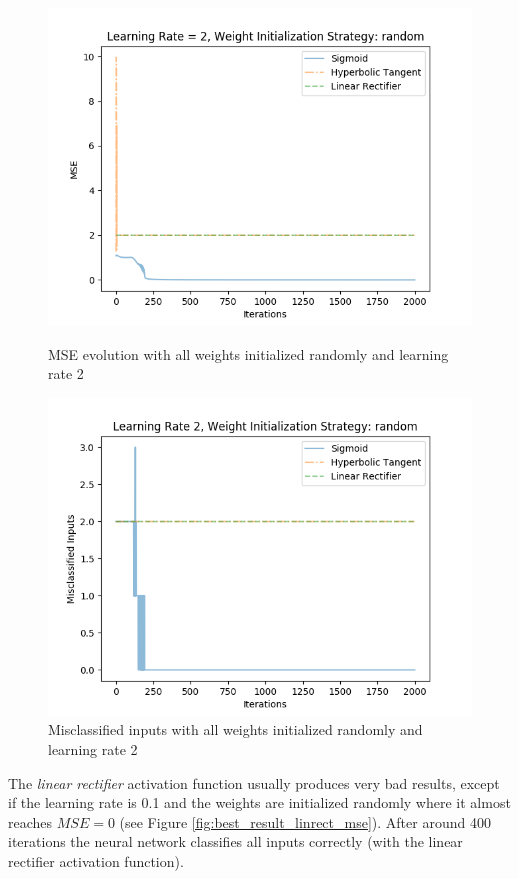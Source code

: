 \documentclass{article}
\begin{document}
\begin{figure}[H]
	\centering
	\includegraphics[width=0.9\linewidth]{img/5/sigmoid-mse.png}
	\caption{MSE evolution with all weights initialized randomly and learning rate 2}
	\label{fig:best_result_sigmoid_mse}
	\centering
	\includegraphics[width=0.9\linewidth]{img/5/sigmoid-inputs.png}
	\caption{Misclassified inputs with all weights initialized randomly and learning rate 2}
	\label{fig:best_result_sigmoid_inputs}
\end{figure}


The \emph{linear rectifier} activation function usually produces very bad results, except if the learning rate is 0.1 and the weights are initialized randomly where it almost reaches $MSE = 0$ (see Figure \ref{fig:best_result_linrect_mse}). After around 400 iterations the neural network classifies all inputs correctly (with the linear rectifier activation function).
\end{document}
